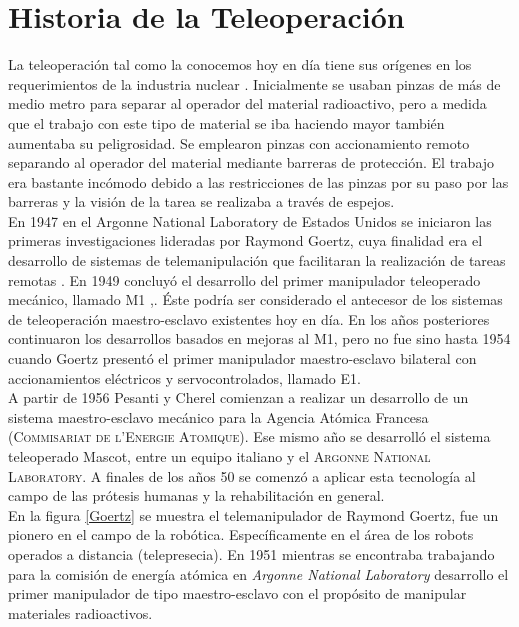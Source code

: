 \section{Historia de la Teleoperación}
La teleoperación tal como la conocemos hoy en día tiene sus orígenes en los requerimientos de la industria nuclear \cite{goertz1952fundamentals}. Inicialmente se usaban pinzas de más de medio metro para separar al operador del material radioactivo, pero a medida que el trabajo con este tipo de material se iba haciendo mayor también aumentaba su  peligrosidad. Se emplearon pinzas con accionamiento remoto separando al operador del material mediante barreras de protección. El trabajo era bastante inc\'omodo debido a las restricciones de las pinzas por su paso por las barreras y la visión de la tarea se realizaba a través de espejos.\\


En 1947 en el Argonne National Laboratory de Estados Unidos se iniciaron las primeras investigaciones lideradas por Raymond Goertz, cuya finalidad era el desarrollo de sistemas de telemanipulación que facilitaran la realización de tareas remotas \cite{goertz1961manipulator}. En 1949 concluyó el desarrollo del primer manipulador teleoperado mecánico, llamado M1 \cite{goertz1952fundamentals},\cite{goertz1954mechanical}. \'Este podría ser considerado el antecesor de los sistemas de teleoperación maestro-esclavo existentes hoy en día. En los años posteriores continuaron los desarrollos basados en mejoras al M1, pero no fue sino hasta 1954 cuando Goertz presentó el primer manipulador maestro-esclavo bilateral con accionamientos eléctricos y servocontrolados, llamado E1.\\


A partir de 1956 Pesanti y Cherel comienzan a realizar un desarrollo de un sistema maestro-esclavo mecánico para la Agencia Atómica Francesa (\textsc{Commisariat de l’Energie Atomique}). Ese mismo año se desarroll\'o el sistema teleoperado Mascot, entre un equipo italiano y el \textsc{Argonne National Laboratory}. A finales de los años 50 se comenzó a aplicar esta tecnología al campo de las prótesis humanas y la rehabilitación en general.\\



En la figura \ref{Goertz} se muestra el telemanipulador de Raymond Goertz, fue un pionero en el campo de la robótica. Específicamente en el área de los robots operados a distancia (telepresecia). En 1951 mientras se encontraba trabajando para la comisión de energía atómica en \textsl{Argonne National Laboratory} desarrollo el primer manipulador de tipo maestro-esclavo con el propósito de manipular materiales radioactivos.


